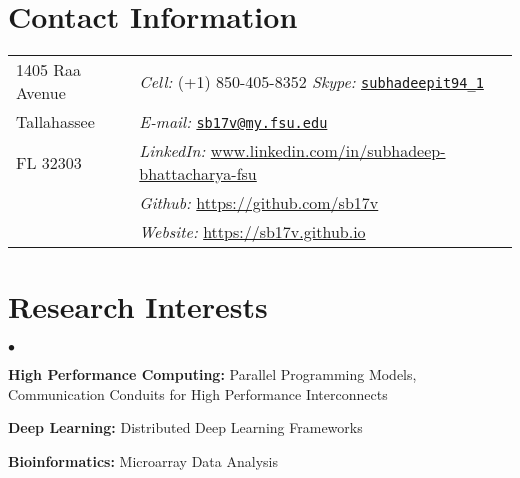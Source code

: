 \documentclass[margin,line]{res}
\newenvironment{list2}{
  \begin{list}{$\bullet$}{%
      \setlength{\itemsep}{0in}
      \setlength{\parsep}{0in} \setlength{\parskip}{0in}
      \setlength{\topsep}{0in} \setlength{\partopsep}{0in} 
      \setlength{\leftmargin}{0.2in}}}{\end{list}}
\begin{document}

\begin{resume}

\section{\sc Contact Information}
\begin{tabular}{@{}p{2in}p{4in}}
1405 Raa Avenue & {\it Cell:}  (+1) 850-405-8352 {\it Skype:}    
\href{https://join.skype.com/invite/S9OC09imwnsO}{\nolinkurl{subhadeepit94\_1}}\\
            
Tallahassee & {\it E-mail:} 
\href{mailto:sb17v@my.fsu.edu}{\nolinkurl{sb17v@my.fsu.edu} } \\
FL 32303 & {\it 
LinkedIn:} \url{www.linkedin.com/in/subhadeep-bhattacharya-fsu}
 \\
 & {\it Github:} \url{https://github.com/sb17v} \\
 & {\it Website:} \url{https://sb17v.github.io} \\
\end{tabular}

\vspace*{-.18in}



\section{\sc Research Interests}
\begin{list2}
	\item \textbf{High Performance Computing:} Parallel Programming Models, 
	Communication Conduits for High Performance Interconnects
	\item \textbf{Deep Learning:} Distributed Deep Learning Frameworks
	\item \textbf{Bioinformatics:} Microarray Data Analysis
\end{list2}


\end{resume}
\end{document}
